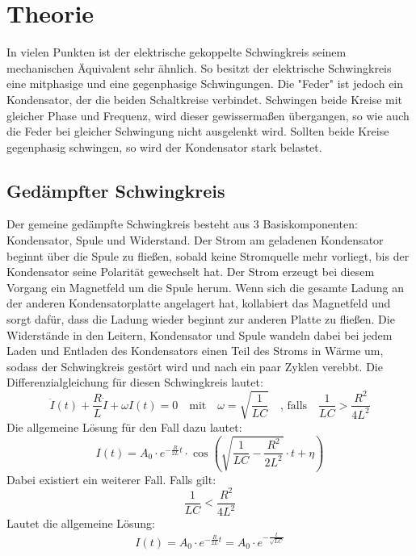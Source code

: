 \section{Theorie}
\label{sec:Theorie}

In vielen Punkten ist der elektrische gekoppelte Schwingkreis seinem mechanischen Äquivalent sehr ähnlich.
So besitzt der elektrische Schwingkreis eine mitphasige und eine gegenphasige Schwingungen. 
Die "Feder" ist jedoch ein Kondensator, der die beiden Schaltkreise verbindet.
Schwingen beide Kreise mit gleicher Phase und Frequenz, wird dieser gewissermaßen übergangen, so wie auch die Feder bei gleicher Schwingung nicht ausgelenkt wird.
Sollten beide Kreise gegenphasig schwingen, so wird der Kondensator stark belastet.
\subsection{Gedämpfter Schwingkreis}
Der gemeine gedämpfte Schwingkreis besteht aus 3 Basiskomponenten: Kondensator, Spule und Widerstand.
Der Strom am geladenen Kondensator beginnt über die Spule zu fließen, sobald keine Stromquelle mehr vorliegt, bis der Kondensator seine Polarität gewechselt hat.
Der Strom erzeugt bei diesem Vorgang ein Magnetfeld um die Spule herum. 
Wenn sich die gesamte Ladung an der anderen Kondensatorplatte angelagert hat, kollabiert das Magnetfeld und sorgt dafür, dass die Ladung wieder beginnt zur anderen Platte zu fließen.
Die Widerstände in den Leitern, Kondensator und Spule wandeln dabei bei jedem Laden und Entladen des Kondensators einen Teil des Stroms in Wärme um, sodass der Schwingkreis gestört wird und nach ein paar Zyklen verebbt.
Die Differenzialgleichung für diesen Schwingkreis lautet:
\begin{equation}
    \ddot{I}(t) + \frac{R}{L}\dot{I} + \omega I(t) = 0 \quad\textrm{mit}\quad \omega = \sqrt{\frac{1}{LC}}
    \quad\textrm{, falls}\quad \frac{1}{LC} > \frac{R^2}{4L^2}
    \label{eq:harmossi}
\end{equation}
Die allgemeine Lösung für den Fall dazu lautet:
\begin{equation}
    I(t) = A_0 \cdot e^{-\frac{R}{2L}t} \cdot \cos{(\sqrt{\frac{1}{LC}-\frac{R^2}{2L^2}}\cdot t+\eta)}
\end{equation}
Dabei existiert ein weiterer Fall. Falls gilt:
\begin{equation}
    \frac{1}{LC} < \frac{R^2}{4L^2}
\end{equation}
Lautet die allgemeine Lösung:
\begin{equation}
    I(t) = A_0 \cdot e^{-\frac{R}{2L}t} = A_0 \cdot e^{-\frac{t}{\sqrt{LC}}}
    \label{eq:harmossi2}
\end{equation}

